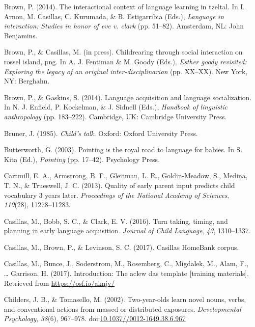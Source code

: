 \documentclass[floatsintext,man]{apa6}
\theoremstyle{definition}
\theoremstyle{definition}
\theoremstyle{definition}
\theoremstyle{remark}
\begin{document}
\hypertarget{ref-brown2014interactional}{}
Brown, P. (2014). The interactional context of language learning in
tzeltal. In I. Arnon, M. Casillas, C. Kurumada, \& B. Estigarribia
(Eds.), \emph{Language in interaction: Studies in honor of eve v. clark}
(pp. 51--82). Amsterdam, NL: John Benjamins.

\hypertarget{ref-brownIPchildrearing}{}
Brown, P., \& Casillas, M. (in press). Childrearing through social
interaction on rossel island, png. In A. J. Fentiman \& M. Goody (Eds.),
\emph{Esther goody revisited: Exploring the legacy of an original
inter-disciplinarian} (pp. XX--XX). New York, NY: Berghahn.

\hypertarget{ref-brown2014language}{}
Brown, P., \& Gaskins, S. (2014). Language acquisition and language
socialization. In N. J. Enfield, P. Kockelman, \& J. Sidnell (Eds.),
\emph{Handbook of linguistic anthropology} (pp. 183--222). Cambridge,
UK: Cambridge University Press.

\hypertarget{ref-bruner1985childs}{}
Bruner, J. (1985). \emph{Child's talk}. Oxford: Oxford University Press.

\hypertarget{ref-butterworth2003pointing}{}
Butterworth, G. (2003). Pointing is the royal road to language for
babies. In S. Kita (Ed.), \emph{Pointing} (pp. 17--42). Psychology
Press.

\hypertarget{ref-cartmill2013quality}{}
Cartmill, E. A., Armstrong, B. F., Gleitman, L. R., Goldin-Meadow, S.,
Medina, T. N., \& Trueswell, J. C. (2013). Quality of early parent input
predicts child vocabulary 3 years later. \emph{Proceedings of the
National Academy of Sciences}, \emph{110}(28), 11278--11283.

\hypertarget{ref-casillas2016turn}{}
Casillas, M., Bobb, S. C., \& Clark, E. V. (2016). Turn taking, timing,
and planning in early language acquisition. \emph{Journal of Child
Language}, \emph{43}, 1310--1337.

\hypertarget{ref-Casillas-HB}{}
Casillas, M., Brown, P., \& Levinson, S. C. (2017). Casillas HomeBank
corpus.

\hypertarget{ref-casillas2017ACLEWDAS}{}
Casillas, M., Bunce, J., Soderstrom, M., Rosemberg, C., Migdalek, M.,
Alam, F., \ldots{} Garrison, H. (2017). Introduction: The aclew das
template {[}training materials{]}. Retrieved from
\url{https://osf.io/aknjv/}

\hypertarget{ref-childers2002two}{}
Childers, J. B., \& Tomasello, M. (2002). Two-year-olds learn novel
nouns, verbs, and conventional actions from massed or distributed
exposures. \emph{Developmental Psychology}, \emph{38}(6), 967--978.
doi:\href{https://doi.org/10.1037//0012-1649.38.6.967}{10.1037//0012-1649.38.6.967}
\end{document}
